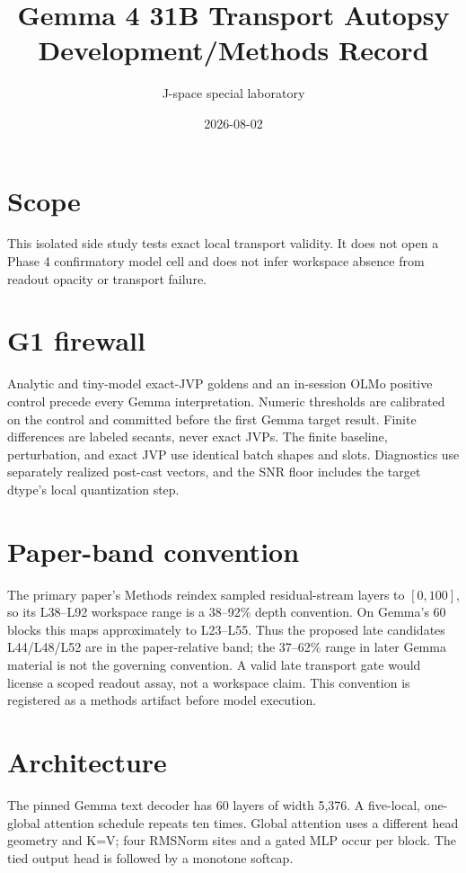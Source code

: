 \documentclass[11pt]{article}
\title{Gemma 4 31B Transport Autopsy\\Development/Methods Record}
\author{J-space special laboratory}
\date{2026-08-02}
\begin{document}
\maketitle
\section{Scope}
This isolated side study tests exact local transport validity. It does not
open a Phase 4 confirmatory model cell and does not infer workspace absence
from readout opacity or transport failure.
\section{G1 firewall}
Analytic and tiny-model exact-JVP goldens and an in-session OLMo positive
control precede every Gemma interpretation. Numeric thresholds are calibrated
on the control and committed before the first Gemma target result. Finite
differences are labeled secants, never exact JVPs.
The finite baseline, perturbation, and exact JVP use identical batch shapes
and slots. Diagnostics use separately realized post-cast vectors, and the SNR
floor includes the target dtype's local quantization step.
\section{Paper-band convention}
The primary paper's Methods reindex sampled residual-stream layers to
$[0,100]$, so its L38--L92 workspace range is a 38--92\% depth convention.
On Gemma's 60 blocks this maps approximately to L23--L55. Thus the proposed
late candidates L44/L48/L52 are in the paper-relative band; the 37--62\%
range in later Gemma material is not the governing convention. A valid late
transport gate would license a scoped readout assay, not a workspace claim.
This convention is registered as a methods artifact before model execution.
\section{Architecture}
The pinned Gemma text decoder has 60 layers of width 5,376. A five-local,
one-global attention schedule repeats ten times. Global attention uses a
different head geometry and K=V; four RMSNorm sites and a gated MLP occur per
block. The tied output head is followed by a monotone softcap.
\end{document}
